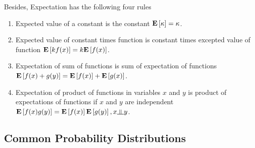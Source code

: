 \begin{description}[leftmargin=0cm]
Besides, Expectation has the following four rules
	\begin{enumerate}
		\item Expected value of a constant is the constant $\mathbf{E}\left[\kappa\right]=\kappa$.
		\item Expected value of constant times function is constant times excepted value of function $\mathbf{E}\left[kf(x)\right]=k\mathbf{E}\left[f(x)\right]$.
		\item Expectation of sum of functions is sum of expectation of functions \\ $\mathbf{E}\left[f(x)+g(y)\right]=\mathbf{E}\left[f(x)\right]+\mathbf{E}\left[g(x)\right]$.
		\item Expectation of product of functions in variables $x$ and $y$ is product of expectations of functions if $x$ and $y$ are independent $\E{f(x)g(y)}=\E{f(x)}\E{g(y)}, x \indep y$.
	\end{enumerate}
\end{description}

\subsection{Common Probability Distributions}

